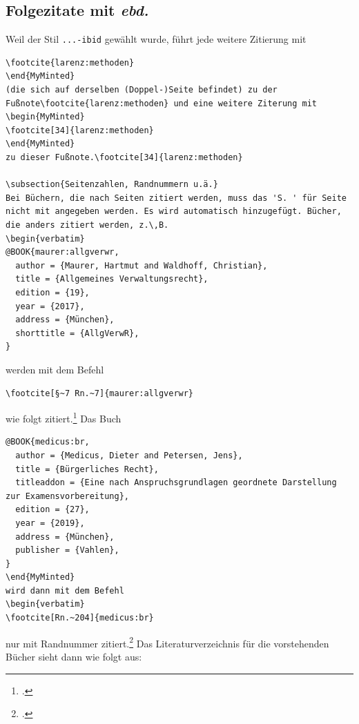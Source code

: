 \documentclass[headings=small,numbers=noenddot, 12pt,oneside]{scrartcl}
\newenvironment{MyMinted}{\VerbatimEnvironment\begin{verbatim}}{\end{verbatim}}
\begin{document}
\subsection{Folgezitate mit \textit{ebd.}}
Weil der Stil \texttt{...-ibid} gewählt wurde, führt jede weitere Zitierung mit 
\begin{MyMinted}
\footcite{larenz:methoden}
\end{MyMinted}
(die sich auf derselben (Doppel-)Seite befindet) zu der Fußnote\footcite{larenz:methoden} und eine weitere Ziterung mit 
\begin{MyMinted}
\footcite[34]{larenz:methoden}
\end{MyMinted}
zu dieser Fußnote.\footcite[34]{larenz:methoden}

\subsection{Seitenzahlen, Randnummern u.ä.}
Bei Büchern, die nach Seiten zitiert werden, muss das 'S. ' für Seite nicht mit angegeben werden. Es wird automatisch hinzugefügt. Bücher, die anders zitiert werden, z.\,B.
\begin{verbatim}
@BOOK{maurer:allgverwr,
  author = {Maurer, Hartmut and Waldhoff, Christian},
  title = {Allgemeines Verwaltungsrecht},
  edition = {19},
  year = {2017},
  address = {München},
  shorttitle = {AllgVerwR},
}
\end{verbatim}
werden mit dem Befehl
\begin{verbatim}
\footcite[§~7 Rn.~7]{maurer:allgverwr}
\end{verbatim}
wie folgt zitiert.\footcite[§~7 Rn.~7]{maurer:allgverwr} Das Buch 
\begin{MyMinted}
@BOOK{medicus:br,
  author = {Medicus, Dieter and Petersen, Jens},
  title = {Bürgerliches Recht},
  titleaddon = {Eine nach Anspruchsgrundlagen geordnete Darstellung zur Examensvorbereitung},
  edition = {27},
  year = {2019},
  address = {München},
  publisher = {Vahlen},
}
\end{MyMinted}
wird dann mit dem Befehl
\begin{verbatim}
\footcite[Rn.~204]{medicus:br}
\end{verbatim}
nur mit Randnummer zitiert.\footcite[Rn.~204]{medicus:br}
Das Literaturverzeichnis für die vorstehenden Bücher sieht dann wie folgt aus: 
\printbibliography[type=book, title={Literaturverzeichnis (nur \texttt{book})},heading=subbibliography, notkeyword={book:diss}]
\end{document}
